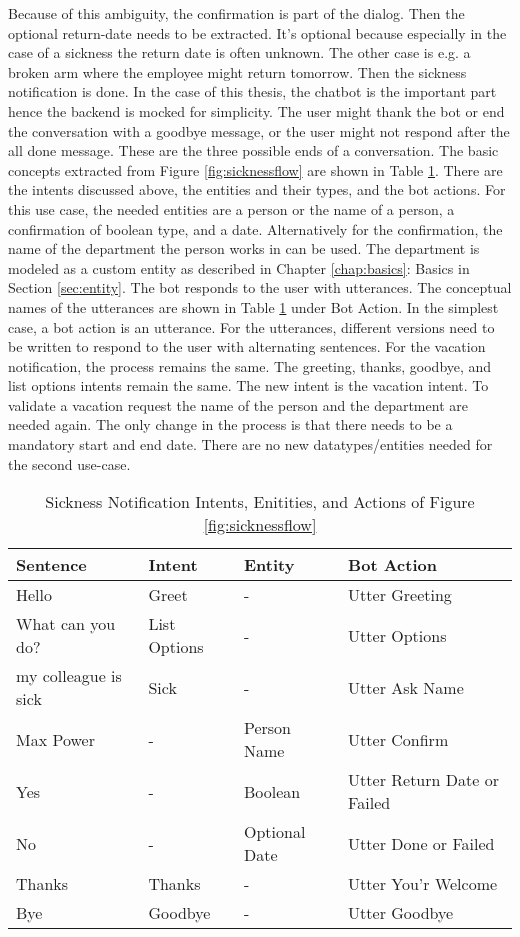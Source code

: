  Because of this ambiguity, the confirmation is part of the dialog.
 Then the optional return-date needs to be extracted.
 It's optional because especially in the case of a sickness the return date is often unknown.
 The other case is e.g. a broken arm where the employee might return tomorrow.
 Then the sickness notification is done.
 In the case of this thesis, the chatbot is the important part hence the backend is mocked for simplicity.
 The user might thank the bot or end the conversation with a goodbye message, or the user might not respond after the all done message.
 These are the three possible ends of a conversation.
 The basic concepts extracted from Figure \ref{fig:sicknessflow} are shown in Table \ref{tab:sick_data}.
 There are the intents discussed above, the entities and their types, and the bot actions.
 For this use case, the needed entities are a person or the name of a person, a confirmation of boolean type, and a date.
 Alternatively for the confirmation, the name of the department the person works in can be used.
 The department is modeled as a custom entity as described in Chapter \ref{chap:basics}: Basics in Section \ref{sec:entity}.
 The bot responds to the user with utterances.
 The conceptual names of the utterances are shown in Table \ref{tab:sick_data} under Bot Action.
 In the simplest case, a bot action is an utterance.
 For the utterances, different versions need to be written to respond to the user with alternating sentences.
 For the vacation notification, the process remains the same.
 The greeting, thanks, goodbye, and list options intents remain the same.
 The new intent is the vacation intent.
 To validate a vacation request the name of the person and the department are needed again.
 The only change in the process is that there needs to be a mandatory start and end date.
 There are no new datatypes/entities needed for the second use-case.

 \begin{table}[h]
    \centering
    \begin{tabular}{ l | l | l | l }
        Sentence & Intent & Entity & Bot Action \\ \hline \hline
        Hello & Greet & - & Utter Greeting \\ \hline
        What can you do? & List Options & - & Utter Options \\ \hline
        my colleague is sick & Sick & - & Utter Ask Name \\ \hline
        Max Power & - & Person Name & Utter Confirm \\ \hline
        Yes & - & Boolean & Utter Return Date or Failed \\ \hline
        No & - & Optional Date & Utter Done or Failed \\ \hline
        Thanks & Thanks & - & Utter You'r Welcome \\ \hline
        Bye & Goodbye & - & Utter Goodbye 
    \end{tabular}
    \caption{Sickness Notification Intents, Enitities, and Actions of Figure \ref{fig:sicknessflow}} \label{tab:sick_data}
\end{table} \noindent

